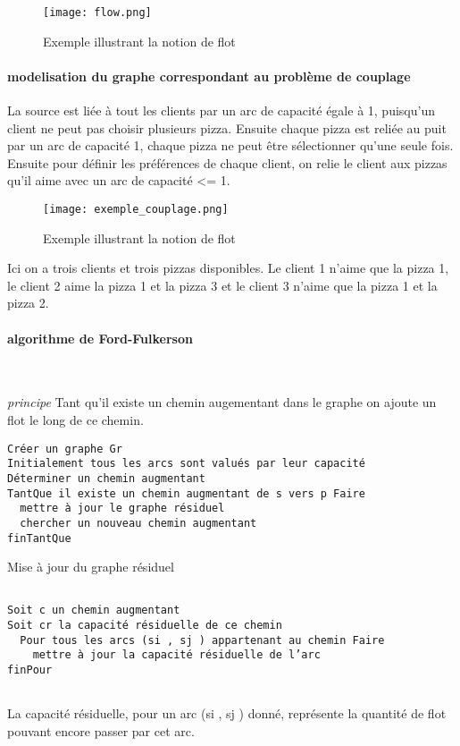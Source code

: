 \begin{figure}[h]
\begin{center}
    \texttt{[image: flow.png]} 
    \caption{Exemple illustrant la notion de flot}

\end{center}
\end{figure}

      \paragraph{modelisation du graphe correspondant au problème de couplage}
      La source est liée à tout les clients par un arc de capacité égale à 1, puisqu'un client ne peut pas choisir plusieurs pizza.
      Ensuite chaque pizza est reliée au puit par un arc de capacité 1, chaque pizza ne peut être sélectionner qu'une seule fois.
      Ensuite pour définir les préférences de chaque client, on relie le client aux pizzas qu'il aime avec un arc de capacité <= 1.

\begin{figure}[h]
\begin{center}
    \texttt{[image: exemple\_couplage.png]}
    \caption{Exemple illustrant la notion de flot}

\end{center}
\end{figure}

Ici on a trois clients et trois pizzas disponibles. Le client 1 n'aime que la pizza 1, le client 2 aime la pizza 1 et la pizza 3 et le client 3 n'aime que la pizza 1 et la pizza 2.


\paragraph{algorithme de Ford-Fulkerson} ~\cite{ref.fordfulkerson}


\emph{principe} Tant qu'il existe un chemin augementant dans le graphe on ajoute un flot le long de ce chemin.

\begin{verbatim}
Créer un graphe Gr
Initialement tous les arcs sont valués par leur capacité
Déterminer un chemin augmentant
TantQue il existe un chemin augmentant de s vers p Faire
  mettre à jour le graphe résiduel
  chercher un nouveau chemin augmentant
finTantQue

\end{verbatim}

Mise à jour du graphe résiduel
\begin{verbatim}

Soit c un chemin augmentant
Soit cr la capacité résiduelle de ce chemin
  Pour tous les arcs (si , sj ) appartenant au chemin Faire
    mettre à jour la capacité résiduelle de l’arc
finPour
 
\end{verbatim}
La capacité résiduelle, pour un arc (si , sj ) donné, représente la quantité de flot pouvant encore passer par cet arc.





